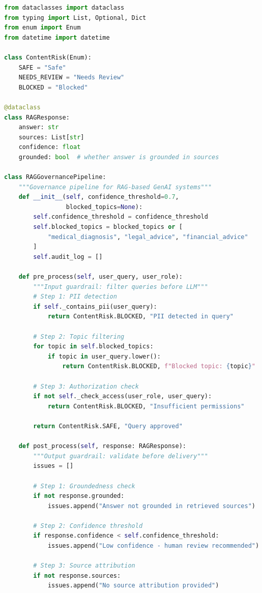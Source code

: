 \begin{lstlisting}[language=Python, caption={RAG 기반 생성형 AI 거버넌스 파이프라인}, label={lst:rag_governance}]
from dataclasses import dataclass
from typing import List, Optional, Dict
from enum import Enum
from datetime import datetime

class ContentRisk(Enum):
    SAFE = "Safe"
    NEEDS_REVIEW = "Needs Review"
    BLOCKED = "Blocked"

@dataclass
class RAGResponse:
    answer: str
    sources: List[str]
    confidence: float
    grounded: bool  # whether answer is grounded in sources

class RAGGovernancePipeline:
    """Governance pipeline for RAG-based GenAI systems"""
    def __init__(self, confidence_threshold=0.7,
                 blocked_topics=None):
        self.confidence_threshold = confidence_threshold
        self.blocked_topics = blocked_topics or [
            "medical_diagnosis", "legal_advice", "financial_advice"
        ]
        self.audit_log = []

    def pre_process(self, user_query, user_role):
        """Input guardrail: filter queries before LLM"""
        # Step 1: PII detection
        if self._contains_pii(user_query):
            return ContentRisk.BLOCKED, "PII detected in query"

        # Step 2: Topic filtering
        for topic in self.blocked_topics:
            if topic in user_query.lower():
                return ContentRisk.BLOCKED, f"Blocked topic: {topic}"

        # Step 3: Authorization check
        if not self._check_access(user_role, user_query):
            return ContentRisk.BLOCKED, "Insufficient permissions"

        return ContentRisk.SAFE, "Query approved"

    def post_process(self, response: RAGResponse):
        """Output guardrail: validate before delivery"""
        issues = []

        # Step 1: Groundedness check
        if not response.grounded:
            issues.append("Answer not grounded in retrieved sources")

        # Step 2: Confidence threshold
        if response.confidence < self.confidence_threshold:
            issues.append("Low confidence - human review recommended")

        # Step 3: Source attribution
        if not response.sources:
            issues.append("No source attribution provided")


\end{lstlisting}
